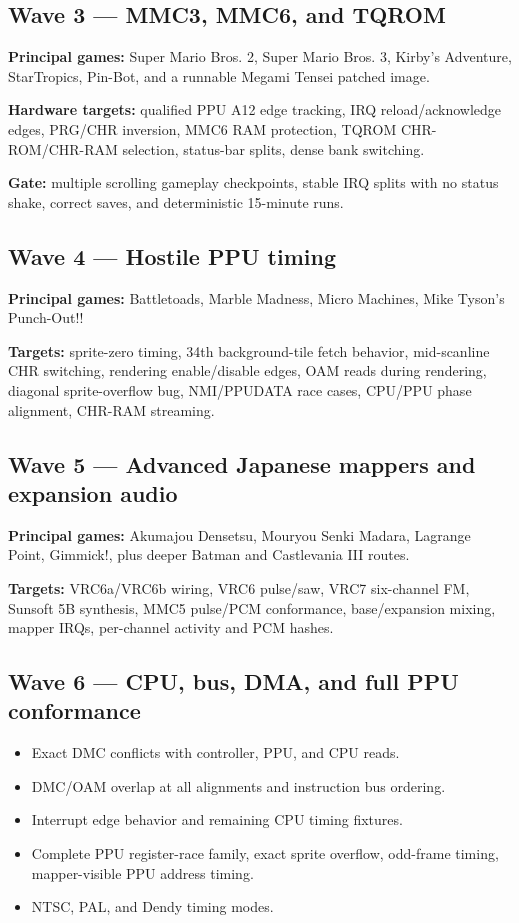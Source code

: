 \documentclass[10pt,letterpaper]{article}
\begin{document}
\subsection{Wave 3 --- MMC3, MMC6, and TQROM}
\textbf{Principal games:} Super Mario Bros. 2, Super Mario Bros. 3, Kirby's Adventure, StarTropics, Pin-Bot, and a runnable Megami Tensei patched image.

\textbf{Hardware targets:} qualified PPU A12 edge tracking, IRQ reload/acknowledge edges, PRG/CHR inversion, MMC6 RAM protection, TQROM CHR-ROM/CHR-RAM selection, status-bar splits, dense bank switching.

\textbf{Gate:} multiple scrolling gameplay checkpoints, stable IRQ splits with no status shake, correct saves, and deterministic 15-minute runs.

\subsection{Wave 4 --- Hostile PPU timing}
\textbf{Principal games:} Battletoads, Marble Madness, Micro Machines, Mike Tyson's Punch-Out!!

\textbf{Targets:} sprite-zero timing, 34th background-tile fetch behavior, mid-scanline CHR switching, rendering enable/disable edges, OAM reads during rendering, diagonal sprite-overflow bug, NMI/PPUDATA race cases, CPU/PPU phase alignment, CHR-RAM streaming.

\subsection{Wave 5 --- Advanced Japanese mappers and expansion audio}
\textbf{Principal games:} Akumajou Densetsu, Mouryou Senki Madara, Lagrange Point, Gimmick!, plus deeper Batman and Castlevania III routes.

\textbf{Targets:} VRC6a/VRC6b wiring, VRC6 pulse/saw, VRC7 six-channel FM, Sunsoft 5B synthesis, MMC5 pulse/PCM conformance, base/expansion mixing, mapper IRQs, per-channel activity and PCM hashes.

\subsection{Wave 6 --- CPU, bus, DMA, and full PPU conformance}
\begin{itemize}
\item Exact DMC conflicts with controller, PPU, and CPU reads.
\item DMC/OAM overlap at all alignments and instruction bus ordering.
\item Interrupt edge behavior and remaining CPU timing fixtures.
\item Complete PPU register-race family, exact sprite overflow, odd-frame timing, mapper-visible PPU address timing.
\item NTSC, PAL, and Dendy timing modes.
\end{itemize}
\end{document}
